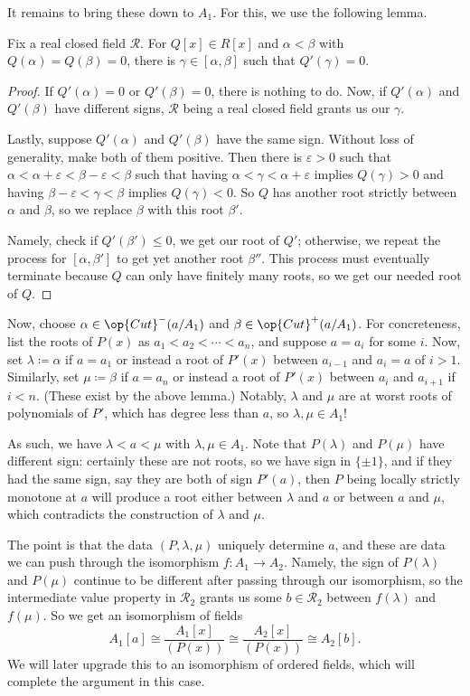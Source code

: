 \documentclass[../notes.tex]{subfiles}
\begin{document}
It remains to bring these down to $A_1$. For this, we use the following lemma.
\begin{lemma}
	Fix a real closed field $\mathcal R$. For $Q[x]\in R[x]$ and $\alpha<\beta$ with $Q(\alpha)=Q(\beta)=0$, there is $\gamma\in[\alpha,\beta]$ such that $Q'(\gamma)=0$.
\end{lemma}
\begin{proof}
	If $Q'(\alpha)=0$ or $Q'(\beta)=0$, there is nothing to do. Now, if $Q'(\alpha)$ and $Q'(\beta)$ have different signs, $\mathcal R$ being a real closed field grants us our $\gamma$.

	Lastly, suppose $Q'(\alpha)$ and $Q'(\beta)$ have the same sign. Without loss of generality, make both of them positive. Then there is $\varepsilon>0$ such that $\alpha<\alpha+\varepsilon<\beta-\varepsilon<\beta$ such that having $\alpha<\gamma<\alpha+\varepsilon$ implies $Q(\gamma)>0$ and having $\beta-\varepsilon<\gamma<\beta$ implies $Q(\gamma)<0$. So $Q$ has another root strictly between $\alpha$ and $\beta$, so we replace $\beta$ with this root $\beta'$.
	
	Namely, check if $Q'(\beta')\le0$, we get our root of $Q'$; otherwise, we repeat the process for $[\alpha,\beta']$ to get yet another root $\beta''$. This process must eventually terminate because $Q$ can only have finitely many roots, so we get our needed root of $Q$.
\end{proof}
Now, choose $\alpha\in\op{Cut}^-(a/A_1)$ and $\beta\in\op{Cut}^+(a/A_1)$. For concreteness, list the roots of $P(x)$ as $a_1<a_2<\cdots<a_n$, and suppose $a=a_i$ for some $i$. Now, set $\lambda\coloneqq\alpha$ if $a=a_1$ or instead a root of $P'(x)$ between $a_{i-1}$ and $a_i=a$ of $i>1$. Similarly, set $\mu\coloneqq\beta$ if $a=a_n$ or instead a root of $P'(x)$ between $a_i$ and $a_{i+1}$ if $i<n$. (These exist by the above lemma.) Notably, $\lambda$ and $\mu$ are at worst roots of polynomials of $P'$, which has degree less than $a$, so $\lambda,\mu\in A_1$!

As such, we have $\lambda<a<\mu$ with $\lambda,\mu\in A_1$. Note that $P(\lambda)$ and $P(\mu)$ have different sign: certainly these are not roots, so we have sign in $\{\pm1\}$, and if they had the same sign, say they are both of sign $P'(a)$, then $P$ being locally strictly monotone at $a$ will produce a root either between $\lambda$ and $a$ or between $a$ and $\mu$, which contradicts the construction of $\lambda$ and $\mu$.

The point is that the data $(P,\lambda,\mu)$ uniquely determine $a$, and these are data we can push through the isomorphism $f\colon A_1\to A_2$. Namely, the sign of $P(\lambda)$ and $P(\mu)$ continue to be different after passing through our isomorphism, so the intermediate value property in $\mathcal R_2$ grants us some $b\in\mathcal R_2$ between $f(\lambda)$ and $f(\mu)$. So we get an isomorphism of fields
\[A_1[a]\cong\frac{A_1[x]}{(P(x))}\cong\frac{A_2[x]}{(P(x))}\cong A_2[b].\]
We will later upgrade this to an isomorphism of ordered fields, which will complete the argument in this case.
\end{document}
